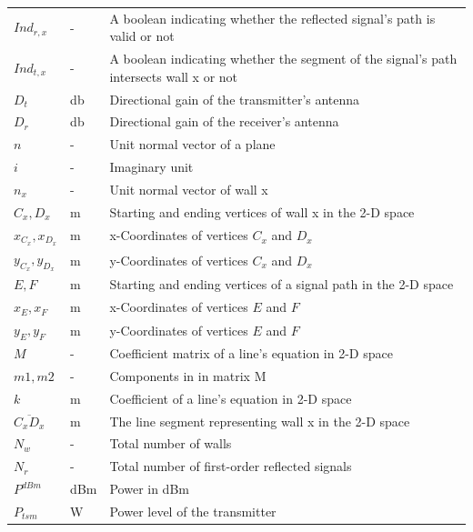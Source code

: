 \documentclass[12pt]{article}
\begin{document}
\begin{longtable*}{l l p{12cm}}
$Ind_{r,x}$ & \si[per-mode=symbol] {-} & A boolean indicating whether the reflected signal's path is valid or not
\\
$Ind_{t,x}$ & \si[per-mode=symbol] {-} & A boolean indicating whether the segment of the signal's path intersects wall x or not
\\
$D_t$ & \si[per-mode=symbol] {\decibel} & Directional gain of the transmitter's antenna
\\
$D_r$ & \si[per-mode=symbol] {\decibel} & Directional gain of the receiver's antenna
\\
$n$ & \si[per-mode=symbol] {-} & Unit normal vector of a plane
\\
$i$ & \si[per-mode=symbol] {-} & Imaginary unit
\\
$n_x$ & \si[per-mode=symbol] {-} & Unit normal vector of wall x
\\
$C_x, D_x$ & \si[per-mode=symbol] {\metre} & Starting and ending vertices of wall x in the 2-D space
\\
$x_{C_x},x_{D_x}$ & \si[per-mode=symbol] {\metre} & x-Coordinates of vertices $C_x$ and $D_x$
\\
$y_{C_x},y_{D_x}$ & \si[per-mode=symbol] {\metre} & y-Coordinates of vertices $C_x$ and $D_x$
\\
$E, F$ & \si[per-mode=symbol] {\metre} & Starting and ending vertices of a signal path 
in the 2-D space
\\
$x_{E},x_{F}$ & \si[per-mode=symbol] {\metre} & x-Coordinates of vertices $E$ and $F$
\\
$y_{E},y_{F}$ & \si[per-mode=symbol] {\metre} & y-Coordinates of vertices $E$ and $F$
\\
$M$ & \si[per-mode=symbol] {-} & Coefficient matrix of a line's equation in 2-D space
\\
$m1,m2$ & \si[per-mode=symbol] {-} & Components in in matrix M
\\
$k$ & \si[per-mode=symbol] {\meter} & Coefficient of a line's equation in 2-D space
\\
$\overline{C_x D_x}$ & \si[per-mode=symbol] {\metre} & The line segment representing 
wall x in the 2-D space
\\
$N_w$ & \si[per-mode=symbol] {-} & Total number of walls
\\
$N_r$ & \si[per-mode=symbol] {-} & Total number of first-order reflected signals
\\
$P^{dBm}$ & \si[per-mode=symbol] {dBm} & Power in dBm
\\
$P_{tsm}$ & \si[per-mode=symbol] {\watt} & Power level of the transmitter

\end{longtable*}
\end{document}
